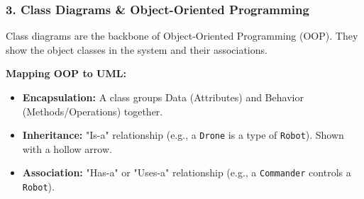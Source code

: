 \documentclass[xcolor=table]{beamer}
\begin{document}
\begin{frame}
    \frametitle{3. Class Diagrams \& Object-Oriented Programming}
    Class diagrams are the backbone of Object-Oriented Programming (OOP). They show the object classes in the system and their associations.
    
    \vspace{0.3cm}
    \textbf{Mapping OOP to UML:}
    \begin{itemize}
        \item \textbf{Encapsulation:} A class groups Data (Attributes) and Behavior (Methods/Operations) together.
        \item \textbf{Inheritance:} "Is-a" relationship (e.g., a \texttt{Drone} is a type of \texttt{Robot}). Shown with a hollow arrow.
        \item \textbf{Association:} "Has-a" or "Uses-a" relationship (e.g., a \texttt{Commander} controls a \texttt{Robot}).
    \end{itemize}
\end{frame}
\end{document}

